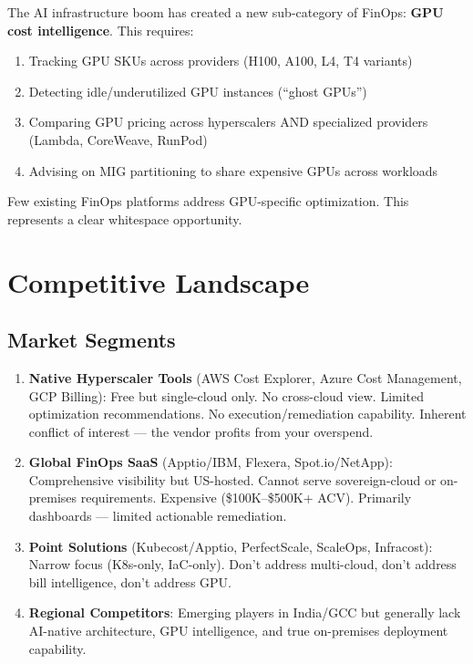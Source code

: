 \documentclass[a4paper,11pt]{article}
\begin{document}
The AI infrastructure boom has created a new sub-category of FinOps: \textbf{GPU cost intelligence}. This requires:
\begin{enumerate}[itemsep=1mm]
    \item Tracking GPU SKUs across providers (H100, A100, L4, T4 variants)
    \item Detecting idle/underutilized GPU instances (``ghost GPUs'')
    \item Comparing GPU pricing across hyperscalers AND specialized providers (Lambda, CoreWeave, RunPod)
    \item Advising on MIG partitioning to share expensive GPUs across workloads
\end{enumerate}

Few existing FinOps platforms address GPU-specific optimization. This represents a clear whitespace opportunity.

\section{Competitive Landscape}

\subsection{Market Segments}

\begin{enumerate}[itemsep=2mm]
    \item \textbf{Native Hyperscaler Tools} (AWS Cost Explorer, Azure Cost Management, GCP Billing): Free but single-cloud only. No cross-cloud view. Limited optimization recommendations. No execution/remediation capability. Inherent conflict of interest --- the vendor profits from your overspend.

    \item \textbf{Global FinOps SaaS} (Apptio/IBM, Flexera, Spot.io/NetApp): Comprehensive visibility but US-hosted. Cannot serve sovereign-cloud or on-premises requirements. Expensive (\$100K--\$500K+ ACV). Primarily dashboards --- limited actionable remediation.

    \item \textbf{Point Solutions} (Kubecost/Apptio, PerfectScale, ScaleOps, Infracost): Narrow focus (K8s-only, IaC-only). Don't address multi-cloud, don't address bill intelligence, don't address GPU.

    \item \textbf{Regional Competitors}: Emerging players in India/GCC but generally lack AI-native architecture, GPU intelligence, and true on-premises deployment capability.
\end{enumerate}
\end{document}
